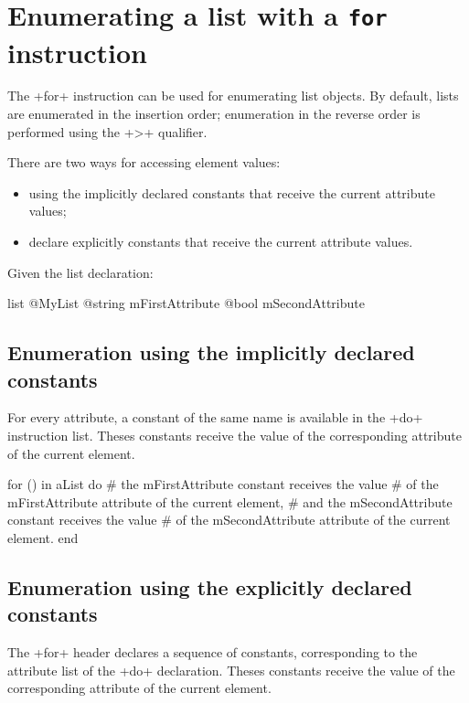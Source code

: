 \section{Enumerating a list with a \texttt{for} instruction}

The \ggs+for+ instruction can be used for enumerating list objects. By default, lists are enumerated in the insertion order; enumeration in the reverse order is performed using the \ggs+>+ qualifier.

There are two ways for accessing element values:
\begin{itemize}
\item using the implicitly declared constants that receive the current attribute values;
\item declare explicitly constants that receive the current attribute values.
\end{itemize}

Given the list declaration:

\begin{galgas}
list @MyList {
  @string mFirstAttribute
  @bool mSecondAttribute
}
\end{galgas}

\subsection{Enumeration using the implicitly declared constants}

For every attribute, a constant of the same name is available in the \ggs+do+ instruction list. Theses constants receive the value of the corresponding attribute of the current element.

\begin{galgas}
for () in aList do
  # the mFirstAttribute constant receives the value
  # of the mFirstAttribute attribute of the current element,
  # and the mSecondAttribute constant receives the value
  # of the mSecondAttribute attribute of the current element.
end
\end{galgas}

\subsection{Enumeration using the explicitly declared constants}

The \ggs+for+ header declares a sequence of constants, corresponding to the attribute list of the \ggs+do+ declaration. Theses constants receive the value of the corresponding attribute of the current element.


